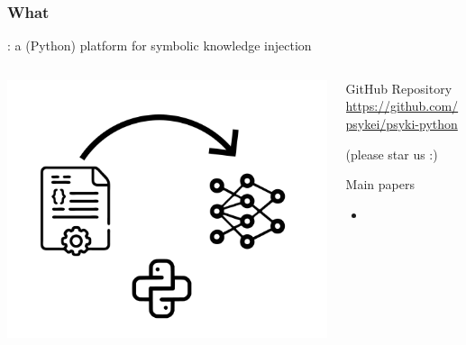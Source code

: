 \documentclass[presentation]{beamer}\mode<presentation>{\usetheme{AMSBolognaFC}}
\begin{document}
\begin{frame}%
    \frametitle{What}

    \alert{\psyki}: a (Python) platform for symbolic knowledge injection

    \begin{columns}
        \begin{column}{.3\linewidth}
            \centering
            \includegraphics[width=\linewidth]{./figures/psyki-logo.pdf}
        \end{column}
        \begin{column}{.7\linewidth}
            \begin{block}{GitHub Repository}\centering
                \alert{\url{https://github.com/psykei/psyki-python}}

                \tiny{(please star us :)}
            \end{block}

            \begin{block}{Main papers}
                \begin{itemize}
                    \item \cite{psyki-extraamas2022}
                \end{itemize}
            \end{block}
        \end{column}
    \end{columns}
\end{frame}

        
\end{document}
